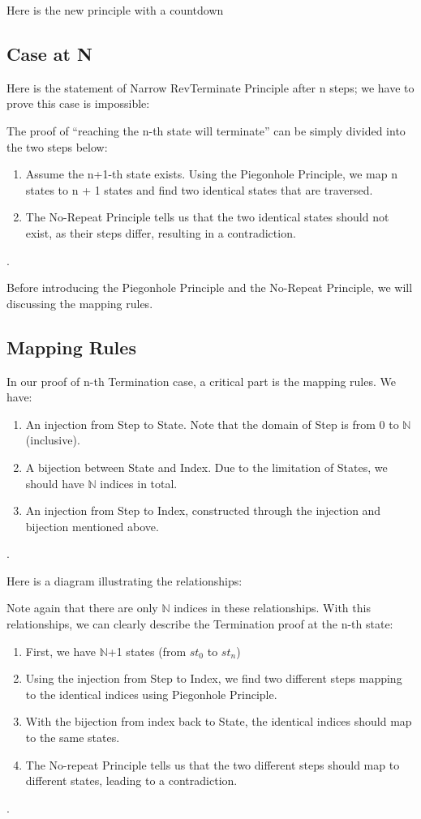 Here is the new principle with a countdown


\subsection{ Case at N }
Here is the statement of Narrow RevTerminate Principle after n steps; we have to prove this case is impossible:


The proof of ``reaching the n-th state will terminate'' can be simply divided into the two steps below:
\begin{enumerate}[1.]
    \item Assume the n+1-th state exists. Using the Piegonhole Principle, we map n states to n + 1 states and find two identical states that are traversed.
    \item The No-Repeat Principle tells us that the two identical states should not exist, as their steps differ, resulting in a contradiction.
\end{enumerate}.

Before introducing the Piegonhole Principle and the No-Repeat Principle, we will discussing the mapping rules.

\subsection{ Mapping Rules }
In our proof of n-th Termination case, a critical part is the mapping rules.
We have:
\begin{enumerate}[1.]
    \item An injection from Step to State.  Note that the domain of Step is from 0 to $\mathbb{N}$ (inclusive).
    \item A bijection between State and Index. Due to the limitation of States, we should have $\mathbb{N}$ indices in total.
    \item An injection from Step to Index, constructed through the injection and bijection mentioned above.
\end{enumerate}.

Here is a diagram illustrating the relationships:


Note again that there are only $\mathbb{N}$ indices in these relationships.
With this relationships, we can clearly describe the Termination proof at the n-th state:
\begin{enumerate}[1.]
    \item First, we have $\mathbb{N}$+1 states (from $st_{0}$ to $st_{n}$)
    \item Using the injection from Step to Index, we find two different steps mapping to the identical indices using Piegonhole Principle.
    \item With the bijection from index back to State, the identical indices should map to the same states.
    \item The No-repeat Principle tells us that the two different steps should map to different states, leading to a contradiction.
\end{enumerate}.

